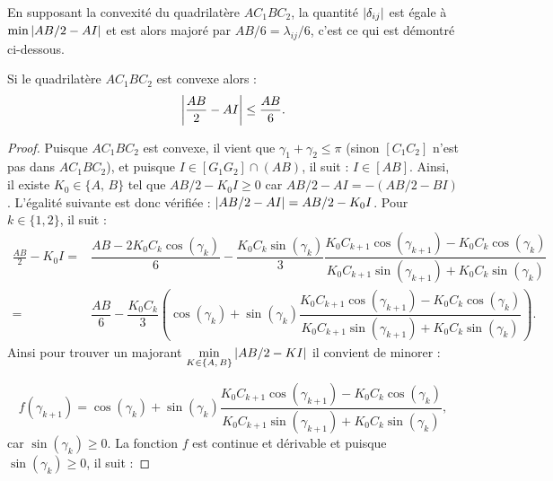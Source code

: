\documentclass[12pt,a4paper]{article}
\begin{document}
	 En supposant la convexité du quadrilatère $AC_1BC_2$, la quantité $\left\lvert \delta_{ij} \right\rvert$ est égale à $\min\left\lvert AB/2-AI \right\rvert$ et est alors majoré par $AB/6 = \lambda_{ij}/6$, c'est ce qui est démontré ci-dessous.
	
	\begin{lm}\label{lm:maj_delta_triangle}
		Si le quadrilatère $AC_1BC_2$ est convexe alors :
		\begin{equation}
			\left\lvert \frac{AB}2-AI \right\rvert \leq \frac{AB}6.
		\end{equation}
	\end{lm} 
	\begin{proof}
		Puisque $AC_1BC_2$ est convexe, il vient que $\gamma_1+\gamma_2 \leq \pi$ (sinon $[C_1C_2]$ n'est pas dans $AC_1BC_2$), et puisque $I \in [G_1G_2]\cap(AB)$, il suit : $I \in [AB]$. Ainsi, il existe $K_0 \in \{A,\,B\}$ tel que $AB/2 - K_0I \geq 0$ car $AB/2-AI = -(AB/2-BI)$. L'égalité suivante est donc vérifiée : $\left\lvert AB/2-AI \right\rvert = AB/2 - K_0I$. Pour $k \in\{1,2\}$, il suit :
		\[
			\begin{aligned}
				\frac{AB}2-K_0I =& \dfrac{AB-2K_0C_k\cos(\gamma_k)}6 - \dfrac{K_0C_k\sin(\gamma_k)}3\dfrac{K_0C_{k+1}\cos(\gamma_{k+1})-K_0C_k\cos(\gamma_k)}{K_0C_{k+1}\sin(\gamma_{k+1})+K_0C_k\sin(\gamma_k)}\\
				=& \dfrac{AB}6 - \dfrac{K_0C_k}3\left(\cos(\gamma_k)+\sin(\gamma_k)\dfrac{K_0C_{k+1}\cos(\gamma_{k+1})-K_0C_k\cos(\gamma_k)}{K_0C_{k+1}\sin(\gamma_{k+1})+K_0C_k\sin(\gamma_k)}\right).
			\end{aligned}
		\]
		Ainsi pour trouver un majorant $\underset{K \in \{A,\,B\}}\min\left\lvert AB/2-KI \right\rvert$ il convient de minorer :
		
		\vspace{-.2cm}
		
		\[
		f(\gamma_{k+1}) = \cos(\gamma_k)+\sin(\gamma_k)\dfrac{K_0C_{k+1}\cos(\gamma_{k+1})-K_0C_k\cos(\gamma_k)}{K_0C_{k+1}\sin(\gamma_{k+1})+K_0C_k\sin(\gamma_k)},
		\]
		car $\sin(\gamma_k)\geq 0$. La fonction $f$ est continue et dérivable et puisque $\sin(\gamma_k) \geq 0$, il suit :
		
		\vspace{-.5cm}
		

\end{proof}
\end{document}
